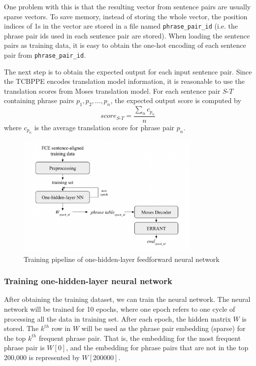 \documentclass[12pt,a4paper,twoside,openright]{report}
\begin{document}
One problem with this is that the resulting vector from sentence pairs are usually sparse vectors. To save memory, instead of storing the whole vector, the position indices of 1s in the vector are stored in a file named \texttt{phrase\_pair\_id} (i.e. the phrase pair ids used in each sentence pair are stored). When loading the sentence pairs as training data, it is easy to obtain the one-hot encoding of each sentence pair from \texttt{phrase\_pair\_id}.

The next step is to obtain the expected output for each input sentence pair. Since the TCBPPE encodes translation model information, it is reasonable to use the translation scores from Moses translation model. For each sentence pair $S\textrm{-}T$ containing phrase pairs $p_1, p_2, ..., p_n$, the expected output score is computed by
\[ score_{S\textrm{-}T} = \frac{\sum_n c_{p_n}}{n} \]
where $c_{p_n}$ is the average translation score for phrase pair $p_n$.

\begin{figure}[ht]
\centering
\includegraphics[width=0.8\textwidth]{images/sparse_pipeline.png}
\caption{Training pipeline of one-hidden-layer feedforward neural network}
\label{fig:sparse_pipeline}
\end{figure}

\subsubsection{Training one-hidden-layer neural network}

After obtaining the training dataset, we can train the neural network. The neural network will be trained for 10 epochs, where one epoch refers to one cycle of processing all the data in training set. After each epoch, the hidden matrix $W$ is stored. The $k^{th}$ row in $W$ will be used as the phrase pair embedding (sparse) for the top $k^{th}$ frequent phrase pair. That is, the embedding for the most frequent phrase pair is $W[0]$, and the embedding for phrase pairs that are not in the top 200,000 is represented by $W[200000]$.
\end{document}
